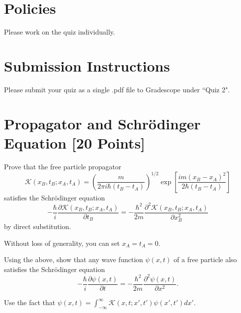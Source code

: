 \newif\ifshowsolutions
\showsolutionsfalse




\pagestyle{fancy}


\section*{Policies}
Please work on the quiz individually.

\section*{Submission Instructions}
Please submit your quiz as a single .pdf file to Gradescope under ``Quiz 2".

\section{Propagator and Schr\"{o}dinger Equation [20 Points]}

\begin{problem}[10]
Prove that the free particle propagator
\begin{equation}
  \mathcal K(x_B, t_B; x_A, t_A) = \left (\frac{m}{2\pi i \hbar (t_B -t_A)}  \right )^{1/2}\exp\left [\frac{im(x_B - x_A)^2}{2\hbar(t_B-t_A)}\right ]
\end{equation}
satisfies the Schr\"{o}dinger equation
\begin{equation}
  -\frac{\hbar}{i}\frac{\partial \mathcal K(x_B, t_B; x_A, t_A)}{\partial t_B} = -\frac{\hbar^2}{2m} \frac{\partial^2 \mathcal K(x_B, t_B; x_A, t_A)}{\partial x_B^2}
\end{equation}
by direct substitution.

\begin{hint}
  Without loss of generality, you can set $x_A = t_A = 0$.
\end{hint}
\end{problem}

\begin{solution}

\end{solution}

\begin{problem}[10]
Using the above, show that any wave function $\psi(x,t)$ of a free particle also satisfies the Schr\"{o}dinger equation
\begin{equation}
  -\frac{\hbar}{i}\frac{\partial \psi(x, t)}{\partial t} = -\frac{\hbar^2}{2m} \frac{\partial^2 \psi(x, t)}{\partial x^2}.
\end{equation}

\begin{hint}
  Use the fact that $\psi(x,t) = \int_{-\infty}^{\infty} \mathcal K(x, t; x', t') \psi(x', t') dx'$.
\end{hint}
\end{problem}

\begin{solution}

\end{solution}


